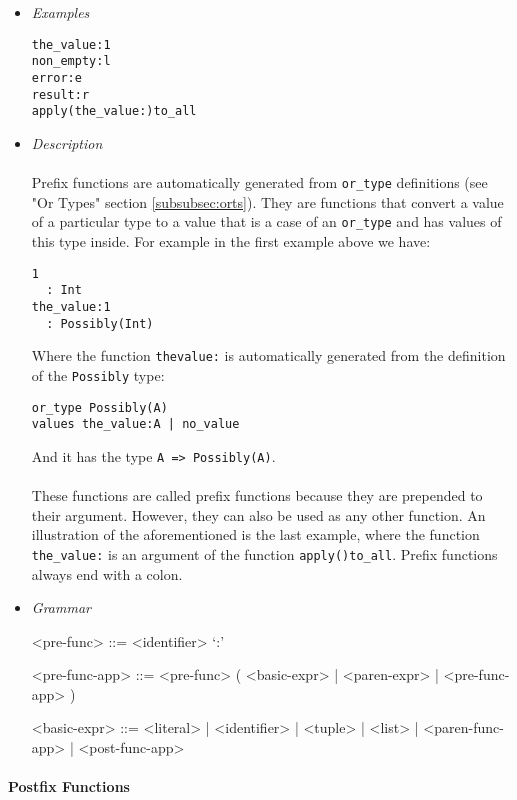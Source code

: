 \documentclass{article}
\begin{document}
\begin{itemize}

\item \textit{Examples}
\begin{verbatim}
the_value:1
non_empty:l
error:e
result:r
apply(the_value:)to_all
\end{verbatim}

\item \textit{Description} \\\\
Prefix functions are automatically generated from \texttt{or_type} definitions
(see "Or Types" section \ref{subsubsec:orts}). They are functions that
convert a value of a particular type to a value that is a case of an
\texttt{or_type} and has values of this type inside. For example in the
first example above we have:
\begin{verbatim}
1 
  : Int
the_value:1
  : Possibly(Int)
\end{verbatim}
Where the function \texttt{thevalue:} is automatically generated from the
definition of the \texttt{Possibly} type:
\begin{verbatim}
or_type Possibly(A)
values the_value:A | no_value
\end{verbatim}
And it has the type \texttt{A => Possibly(A)}.
\\\\
These functions are called prefix functions because they are prepended to
their argument. However, they can also be used as any other function.
An illustration of the aforementioned is the last example, where the function
\texttt{the_value:} is an argument of the function \texttt{apply()to_all}.
Prefix functions always end with a colon.

\item \textit{Grammar}
\begin{grammar}
<pre-func> ::= <identifier> `:'

<pre-func-app> ::= <pre-func> ( <basic-expr> | <paren-expr> | <pre-func-app> )

<basic-expr> ::=
<literal> | <identifier> | <tuple> | <list> | <paren-func-app> | <post-func-app> 
\end{grammar}

\end{itemize}

\paragraph{Postfix Functions}
\end{document}
